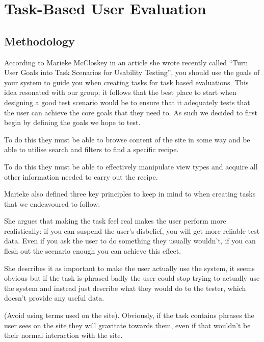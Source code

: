 \section{Task-Based User Evaluation}

\subsection{Methodology}

According to Marieke McCloskey in an article she wrote recently called
``Turn User Goals into Task Scenarios for Usability
Testing''\cite{Mccloskey}, you should use the goals of your system to
guide you when creating tasks for task based evaluations. This idea
resonated with our group; it follows that the best place to start when
designing a good test scenario would be to ensure that it adequately
tests that the user can achieve the core goals that they need to. As
such we decided to first begin by defining the goals we hope to test.

 To do this they must be able
to browse content of the site in some way and be able to utilise
search and filters to find a specific recipe.

 To do this they must be able to
effectively manipulate view types and acquire all other information
needed to carry out the recipe.

\vspace{5mm}
Marieke also defined three key principles to keep in mind to when
creating tasks that we endeavoured to follow:

 She argues that making
the task feel real makes the user perform more realistically: if you
can suspend the user's disbelief, you will get more reliable test
data. Even if you ask the user to do something they usually wouldn't,
if you can flesh out the scenario enough you can achieve this effect.

 She describes it as important to make
the user actually use the system, it seems obvious but if the task is
phrased badly the user could stop trying to actually use the system
and instead just describe what they would do to the tester, which
doesn’t provide any useful data.

 (Avoid using terms used on the site).
Obviously, if the task contains phrases the user sees on the site they
will gravitate towards them, even if that wouldn't be their normal
interaction with the site.


